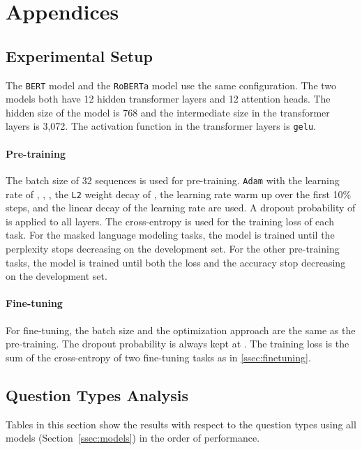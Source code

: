 \documentclass[11pt,a4paper]{article}
\newcommand{\textsec}[1]{\textsection\ref{#1}}
\begin{document}
\cleardoublepage\appendix
\section{Appendices}
\label{sec:supplemental-materials}

\subsection{Experimental Setup}
\label{sup:experimental-setup}

The \texttt{BERT} model and the \texttt{RoBERTa} model use the same configuration. The two models both have 12 hidden transformer layers and 12 attention heads. The hidden size of the model is 768 and the intermediate size in the transformer layers is 3,072. The activation function in the transformer layers is \texttt{gelu}.

\paragraph{Pre-training} 

The batch size of 32 sequences is used for pre-training.
\texttt{Adam} with the learning rate of , , , the \texttt{L2} weight decay of , the learning rate warm up over the first 10\% steps, and the linear decay of the learning rate are used.
A dropout probability of  is applied to all layers.
The cross-entropy is used for the training loss of each task.
For the masked language modeling tasks, the model is trained until the perplexity stops decreasing on the development set. For the other pre-training tasks, the model is trained until both the loss and the accuracy stop decreasing on the development set.

\paragraph{Fine-tuning}

For fine-tuning, the batch size and the optimization approach are the same as the pre-training.
The dropout probability is always kept at . The training loss is the sum of the cross-entropy of two fine-tuning tasks as in \textsec{ssec:finetuning}.

\subsection{Question Types Analysis}
\label{sup:question-type-analysis}

Tables in this section show the results with respect to the question types using all models (Section~\ref{ssec:models}) in the order of performance. 
\end{document}
